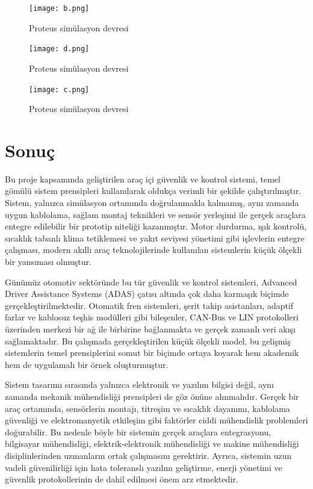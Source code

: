 \documentclass[conference]{IEEEtran}
\begin{document}
\begin{figure}[H]
\centering
\texttt{[image: b.png]}
\caption{Proteus simülasyon devresi}
\end{figure}

\begin{figure}[H]
\centering
\texttt{[image: d.png]}
\caption{Proteus simülasyon devresi}
\end{figure}



\begin{figure}[H]
\centering
\texttt{[image: c.png]}
\caption{Proteus simülasyon devresi}
\end{figure}




\section{Sonuç}
Bu proje kapsamında geliştirilen araç içi güvenlik ve kontrol sistemi, temel gömülü sistem prensipleri kullanılarak oldukça verimli bir şekilde çalıştırılmıştır. Sistem, yalnızca simülasyon ortamında doğrulanmakla kalmamış, aynı zamanda uygun kablolama, sağlam montaj teknikleri ve sensör yerleşimi ile gerçek araçlara entegre edilebilir bir prototip niteliği kazanmıştır. Motor durdurma, ışık kontrolü, sıcaklık tabanlı klima tetiklemesi ve yakıt seviyesi yönetimi gibi işlevlerin entegre çalışması, modern akıllı araç teknolojilerinde kullanılan sistemlerin küçük ölçekli bir yansıması olmuştur.

Günümüz otomotiv sektöründe bu tür güvenlik ve kontrol sistemleri, Advanced Driver Assistance Systems (ADAS) çatısı altında çok daha karmaşık biçimde gerçekleştirilmektedir. Otomatik fren sistemleri, şerit takip asistanları, adaptif farlar ve kablosuz teşhis modülleri gibi bileşenler, CAN-Bus ve LIN protokolleri üzerinden merkezi bir ağ ile birbirine bağlanmakta ve gerçek zamanlı veri akışı sağlamaktadır. Bu çalışmada gerçekleştirilen küçük ölçekli model, bu gelişmiş sistemlerin temel prensiplerini somut bir biçimde ortaya koyarak hem akademik hem de uygulamalı bir örnek oluşturmuştur.

Sistem tasarımı sırasında yalnızca elektronik ve yazılım bilgisi değil, aynı zamanda mekanik mühendisliği prensipleri de göz önüne alınmalıdır. Gerçek bir araç ortamında, sensörlerin montajı, titreşim ve sıcaklık dayanımı, kablolama güvenliği ve elektromanyetik etkileşim gibi faktörler ciddi mühendislik problemleri doğurabilir. Bu nedenle böyle bir sistemin gerçek araçlara entegrasyonu, bilgisayar mühendisliği, elektrik-elektronik mühendisliği ve makine mühendisliği disiplinlerinden uzmanların ortak çalışmasını gerektirir. Ayrıca, sistemin uzun vadeli güvenilirliği için hata toleranslı yazılım geliştirme, enerji yönetimi ve güvenlik protokollerinin de dahil edilmesi önem arz etmektedir.
\end{document}
